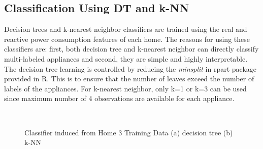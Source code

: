 \documentclass[11pt, letterpaper]{article}
\begin{document}
\subsection{Classification Using DT and k-NN}
Decision trees and k-nearest neighbor classifiers are trained using the real and reactive power consumption features of each home.  The reasons for using these classifiers are: first, both decision tree and k-nearest neighbor can directly classify multi-labeled appliances and second, they are simple and highly interpretable.  The decision tree learning is controlled by reducing the \textit{minsplit} in rpart package provided in R. This is to ensure that the number of leaves exceed the number of labels of the appliances.  For k-nearest neighbor, only k=1 or k=3 can be used since maximum number of 4 observations are available for each appliance.  
\begin{figure}[!ht]
  \centering
  \quad
  \\
  \caption{Classifier induced from Home 3 Training Data (a) decision tree (b) k-NN}
  \label{fig:Classifier}
\end{figure}
\end{document}
